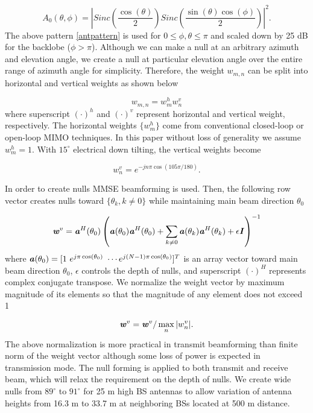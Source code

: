 \documentclass[twocolumn]{IEEEtran}
\begin{document}
\begin{equation}
A_{0}(\theta, \phi)= \left | Sinc\left ( \frac{ \cos (\theta)} {2}
\right ) Sinc\left ( \frac {\sin (\theta) \cos(\phi)} {2} \right)
\right |^2.
\end{equation}
The above pattern \eqref{antpattern} is used for $0 \le \phi, \theta
\le \pi$ and scaled down by 25 dB for the backlobe ($\phi>\pi$).
Although we can make a null at an arbitrary azimuth and elevation
angle, we create a null at particular elevation angle over the
entire range of azimuth angle for simplicity. Therefore, the weight
$w_{m,n}$ can be split into horizontal and vertical weights as shown
below

\begin{equation}
w_{m,n}=w_m^h w_n^v
\end{equation}
where superscript $(\cdot)^h$ and $(\cdot)^v$ represent horizontal
and vertical weight, respectively. The horizontal weights $\{ w_m^h
\}$ come from conventional closed-loop or open-loop MIMO techniques.
In this paper without loss of generality we assume $w_m^h=1$. With
$15^{\circ}$ electrical down tilting, the vertical weights become

\begin{equation}
w_n^v = e^{-j n\pi \cos (105 \pi /180 )}.
\end{equation}

In order to create nulls MMSE beamforming is used. Then, the
following row vector creates nulls toward $\{\theta_k, k\neq0\}$
while maintaining main beam direction $\theta_0$

\begin{equation}
\textbf{\textit{w}}^v = \textbf{\textit{a}}^H(\theta_0) \left
(\textbf{\textit{a}}(\theta_0) \textbf{\textit{a}}^H(\theta_0) +
\sum_{k\neq 0} \textbf{\textit{a}}(\theta_k)
\textbf{\textit{a}}^H(\theta_k) +\epsilon \textbf{\textit{I}} \right
)^{-1}
\end{equation}
where $\textbf{\textit{a}}(\theta_0)= [1~ e^{j \pi \cos (\theta_0)}~
\cdots e^{j (N-1)\pi \cos (\theta_0)}]^T $ is an array vector toward
main beam direction $\theta_0$, $\epsilon$ controls the depth of
nulls, and superscript $(\cdot)^H$ represents complex conjugate
transpose. We normalize the weight vector by maximum magnitude of
its elements so that the magnitude of any element does not exceed 1

\begin{equation}
\textbf{\textit{w}}^v = \textbf{\textit{w}}^v/\max_n |w_n^v|.
\end{equation}
The above normalization is more practical in transmit beamforming
than finite norm of the weight vector although some loss of power is
expected in transmission mode. The null forming is applied to both
transmit and receive beam, which will relax the requirement on the
depth of nulls. We create wide nulls from $89^\circ$ to $91^\circ$
for 25 m high BS antennas to allow variation of antenna heights from
16.3 m to 33.7 m at neighboring BSs located at 500 m distance.
\end{document}
